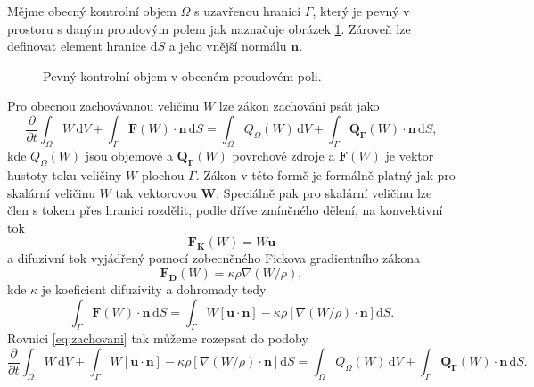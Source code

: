 Mějme obecný kontrolní objem $\Omega$ s uzavřenou hranicí $\Gamma$, který je pevný v prostoru s daným proudovým polem jak naznačuje obrázek \ref{fig:kontrolni-objem}. Zároveň lze definovat element hranice $\mathrm{d}S$ a jeho vnější normálu $\mathbf{n}$.
\begin{figure}[h]
	\def\svgwidth{0.8\textwidth}
	\def\svgwidth{\columnwidth}
	\graphicspath{{img/inkscape/}}
	
	\caption{Pevný kontrolní objem v obecném proudovém poli.}
	\label{fig:kontrolni-objem}
\end{figure}

Pro obecnou zachovávanou veličinu $W$ lze zákon zachování psát jako
\begin{equation}\label{eq:zachovani}
\dfrac{\partial}{\partial t} \int_{\Omega}W\,\mathrm{d}V + \int_{\Gamma}\mathbf{F}(W) \cdot \mathbf{n} \, \mathrm{d}S = \int_{\Omega}Q_\Omega(W) \, \mathrm{d}V + \int_{\Gamma} \mathbf{Q_\Gamma}(W) \cdot \mathbf{n} \, \mathrm{d}S,
\end{equation}
kde $Q_{\Omega}(W)$ jsou objemové a  $\mathbf{Q_\Gamma}(W)$ povrchové zdroje a $\mathbf{F}(W) $ je vektor hustoty toku veličiny $W$ plochou $\Gamma$. Zákon v této formě je formálně platný jak pro skalární veličinu $W$ tak vektorovou $\mathbf{W}$. Speciálně pak pro skalární veličinu lze člen s tokem přes hranici rozdělit, podle dříve zmíněného dělení, na konvektivní tok
\begin{equation}\label{eq:konv_tok}
\mathbf{F_K}(W) = W\mathbf{u}
\end{equation}
a difuzivní tok vyjádřený pomocí zobecněného Fickova gradientního zákona
\begin{equation}\label{eq:diff_tok}
\mathbf{F_D}(W) = \kappa \rho \nabla(W/\rho),
\end{equation}
kde $\kappa$ je koeficient difuzivity a dohromady tedy
\begin{equation}
\int_{\Gamma}\mathbf{F}(W) \cdot \mathbf{n} \, \mathrm{d}S = \int_{\Gamma}W\left[\mathbf{u}\cdot\mathbf{n}\right] - \kappa \rho \left[\nabla(W/\rho)\cdot \mathbf{n} \right] \mathrm{d}S.
\end{equation}
Rovnici \ref{eq:zachovani} tak můžeme rozepsat do podoby
\begin{equation}\label{eq:zachovani_skalarStoky}
\dfrac{\partial}{\partial t} \int_{\Omega}W\,\mathrm{d}V + \int_{\Gamma}W\left[\mathbf{u}\cdot\mathbf{n}\right] - \kappa \rho \left[\nabla(W/\rho)\cdot \mathbf{n} \right] \mathrm{d}S = \int_{\Omega}Q_\Omega(W) \, \mathrm{d}V + \int_{\Gamma} \mathbf{Q_\Gamma}(W) \cdot \mathbf{n} \, \mathrm{d}S.
\end{equation}
